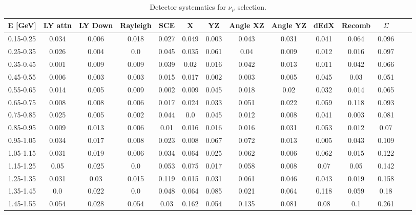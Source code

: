 \begin{table}[H]
\centering
\small
\setlength{\tabcolsep}{3pt}
\renewcommand{\arraystretch}{1.25}
 \begin{tabular}{| c | c | c | c | c | c | c | c | c | c | c | c | c | c | } 
 \hline
    E [GeV] & LY attn & LY Down & Rayleigh & SCE & X & YZ & Angle XZ & Angle YZ & dEdX & Recomb & $\Sigma$ \\ \hline
0.15-0.25 & 0.034 & 0.006 & 0.018 & 0.027 & 0.049 & 0.003 & 0.043 & 0.031 & 0.041 & 0.064 & 0.096 \\
0.25-0.35 & 0.026 & 0.004 & 0.0 & 0.045 & 0.035 & 0.061 & 0.04 & 0.009 & 0.012 & 0.016 & 0.097 \\
0.35-0.45 & 0.001 & 0.009 & 0.009 & 0.039 & 0.02 & 0.016 & 0.042 & 0.013 & 0.011 & 0.042 & 0.066 \\
0.45-0.55 & 0.006 & 0.003 & 0.003 & 0.015 & 0.017 & 0.002 & 0.003 & 0.005 & 0.045 & 0.03 & 0.051 \\
0.55-0.65 & 0.014 & 0.005 & 0.009 & 0.002 & 0.009 & 0.045 & 0.018 & 0.02 & 0.032 & 0.014 & 0.065 \\
0.65-0.75 & 0.008 & 0.008 & 0.006 & 0.017 & 0.024 & 0.033 & 0.051 & 0.022 & 0.059 & 0.118 & 0.093 \\
0.75-0.85 & 0.025 & 0.005 & 0.002 & 0.044 & 0.0 & 0.045 & 0.012 & 0.008 & 0.041 & 0.003 & 0.081 \\
0.85-0.95 & 0.009 & 0.013 & 0.006 & 0.01 & 0.016 & 0.016 & 0.016 & 0.031 & 0.053 & 0.012 & 0.07 \\
0.95-1.05 & 0.034 & 0.017 & 0.008 & 0.023 & 0.008 & 0.067 & 0.072 & 0.013 & 0.005 & 0.043 & 0.109 \\
1.05-1.15 & 0.031 & 0.019 & 0.006 & 0.034 & 0.064 & 0.025 & 0.062 & 0.006 & 0.062 & 0.015 & 0.122 \\
1.15-1.25 & 0.05 & 0.025 & 0.0 & 0.053 & 0.075 & 0.017 & 0.058 & 0.008 & 0.07 & 0.05 & 0.142 \\
1.25-1.35 & 0.031 & 0.03 & 0.015 & 0.119 & 0.015 & 0.031 & 0.061 & 0.046 & 0.043 & 0.019 & 0.158 \\
1.35-1.45 & 0.0 & 0.022 & 0.0 & 0.048 & 0.064 & 0.085 & 0.021 & 0.064 & 0.118 & 0.059 & 0.18 \\
1.45-1.55 & 0.054 & 0.028 & 0.054 & 0.03 & 0.162 & 0.054 & 0.135 & 0.081 & 0.08 & 0.1 & 0.261 \\
 \hline
 \end{tabular}
 \caption{\label{tab:detsys:numu} Detector systematics for $\nu_{\mu}$ selection.}
\end{table}

